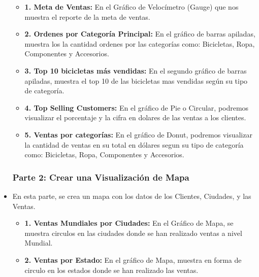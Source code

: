 \begin{itemize}
\begin{itemize}
	\item{\textbf{1. Meta de Ventas: }} En el Gráfico de Velocímetro (Gauge) que nos muestra el reporte de la meta de ventas.
	\item {\textbf{2. Ordenes por Categoría Principal: }}En el gráfico de barras apiladas, muestra los la cantidad ordenes por las categorías como: Bicicletas, Ropa, Componentes y Accesorios.
	\item {\textbf{3. Top 10 bicicletas más vendidas: }}En el segundo gráfico de barras apiladas, muestra el top 10 de las bicicletas mas vendidas según su tipo de categoría.
	\item {\textbf{4. Top Selling Customers: }}En el gráfico de Pie o Circular, podremos visualizar el porcentaje y la cifra en dolares de las ventas a los clientes.
	\item {\textbf{5. Ventas por categorías: }}En el gráfico de Donut, podremos visualizar la cantidad de ventas en su total en dólares segun su tipo de categoría como: Bicicletas, Ropa, Componentes y Accesorios. 
	\end{itemize}

\begin{figure}[h]
	\begin{center}
	\end{center}
	\end{figure}
		

\subsubsection{Parte 2: Crear una Visualización de Mapa}
	\item En esta parte, se crea un mapa con los datos de los Clientes, Ciudades, y las Ventas.
\begin{itemize}
	\item{\textbf{1. Ventas Mundiales por Ciudades: }} En el Gráfico de Mapa, se muestra circulos en las ciudades donde se han realizado ventas a nivel Mundial.
	\item {\textbf{2. Ventas por Estado: }}En el gráfico de Mapa, muestra en forma de circulo en los estados donde se han realizado las ventas.
	\end{itemize}



\end{itemize}
